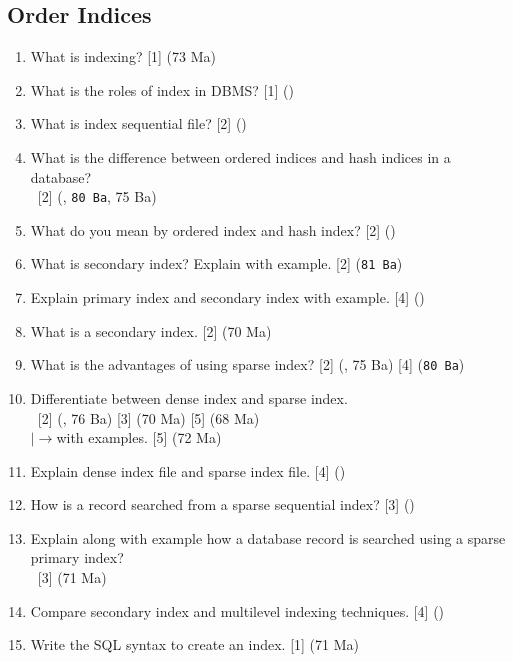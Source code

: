 \documentclass[12pt]{article}
\newcommand{\lb}{\\$\left|\rightarrow\right.$}
\newcommand{\enter}{\\\textcolor{white}{1}}
\begin{document}
    \subsection{Order Indices}
    	\begin{enumerate}[noitemsep, topsep = 0pt]    			
            \item What is indexing? \hfill [1] (73 Ma)			
            
            \item What is the roles of index in DBMS? \hfill [1] ()
            
            \item What is index sequential file? \hfill [2] ()
            
            \item What is the difference between ordered indices and hash indices in a database?
            \enter\hfill [2] (, \texttt{80 Ba}, 75 Ba)
            
            \item What do you mean by ordered index and hash index? \hfill [2] ()  
            
            \item What is secondary index? Explain with example. \hfill [2] (\texttt{81 Ba})
            
            \item Explain primary index and secondary index with example. \hfill [4] ()
            
            \item What is a secondary index. \hfill [2] (70 Ma)
            
            \item What is the advantages of using sparse index? \hfill [2] (, 75 Ba) [4] (\texttt{80 Ba})
            
            \item Differentiate between dense index and sparse index.
            \enter\hfill [2] (, 76 Ba) [3] (70 Ma) [5] (68 Ma)    
            \lb with examples. \hfill [5] (72 Ma)
            
            \item Explain dense index file and sparse index file. \hfill [4] ()
            
            \item How is a record searched from a sparse sequential index? \hfill [3] ()
            
            \item Explain along with example how a database record is searched using a sparse primary index?
            \enter\hfill [3] (71 Ma)
            
            \item Compare secondary index and multilevel indexing techniques. \hfill [4] ()
            
            \item Write the SQL syntax to create an index. \hfill [1] (71 Ma)
    \end{enumerate}
		
\end{document}
